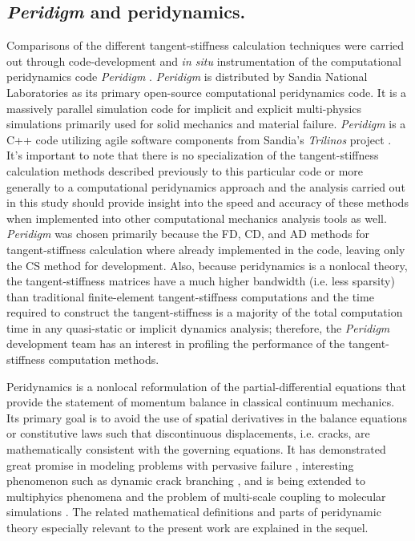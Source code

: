 \documentclass[preprint,12pt]{elsarticle}
\begin{document}
\subsection{\emph{Peridigm} and peridynamics.}
%
Comparisons of the different tangent-stiffness calculation techniques were
carried out through code-development and \emph{in situ} instrumentation of the
computational peridynamics code \emph{Peridigm} \cite{peridigm}.
\emph{Peridigm} is distributed by Sandia National Laboratories as its primary
open-source computational peridynamics code. It is a massively parallel
simulation code for implicit and explicit multi-physics simulations primarily
used for solid mechanics and material failure. \emph{Peridigm} is a C++ code
utilizing agile software components from Sandia's  \emph{Trilinos} project
\cite{trilinos}. It's important to note that there is no specialization of the
tangent-stiffness calculation methods described previously to this particular
code or more generally to a computational peridynamics approach and the
analysis carried out in this study should provide insight into the speed and
accuracy of these methods when implemented into other computational mechanics
analysis tools as well.  \emph{Peridigm} was chosen primarily because the FD,
CD, and AD methods for tangent-stiffness calculation where already implemented
in the code, leaving only the CS method for development. Also, because
peridynamics is a nonlocal theory, the tangent-stiffness matrices have a much
higher bandwidth (i.e. less sparsity) than traditional finite-element
tangent-stiffness computations and the time required to construct the
tangent-stiffness is a majority of the total computation time in any
quasi-static or implicit dynamics analysis; therefore, the \emph{Peridigm}
development team has an interest in profiling the performance of the
tangent-stiffness computation methods.

Peridynamics \cite{silling2000ret,silling:psa,silling2010peridynamic}
is a nonlocal reformulation of the partial-differential equations that provide
the statement of momentum balance in classical continuum mechanics. Its primary
goal is to avoid the use of spatial derivatives in the balance equations or
constitutive laws such that discontinuous displacements, i.e. cracks, are
mathematically consistent with the governing equations. It has demonstrated
great promise in modeling problems with pervasive failure
\cite{littlewood2010}, interesting phenomenon such as dynamic crack branching
\cite{ha2010sod}, and is being extended to multiphyics phenomena
\cite{bobaru2011peridynamic,katiyar2013} and the problem of multi-scale
coupling to molecular simulations \cite{seleson2009peridynamics}. The related mathematical
definitions and parts of peridynamic theory especially relevant to the present
work are explained in the sequel. 
\end{document}
